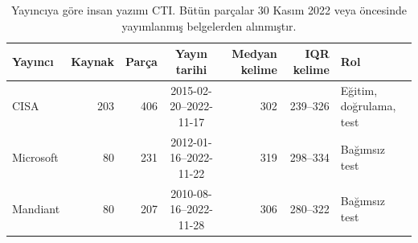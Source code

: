 \begin{table}[t]
\centering
\footnotesize
\caption{Yayıncıya göre insan yazımı CTI. Bütün parçalar 30 Kasım 2022 veya öncesinde yayımlanmış belgelerden alınmıştır.}
\label{tab:external}
\begin{tabular}{lrrcrrl}
\toprule
Yayıncı & Kaynak & Parça & Yayın tarihi & Medyan kelime & IQR kelime & Rol \\
\midrule
CISA & 203 & 406 & 2015-02-20--2022-11-17 & 302 & 239--326 & Eğitim, doğrulama, test \\
Microsoft & 80 & 231 & 2012-01-16--2022-11-22 & 319 & 298--334 & Bağımsız test \\
Mandiant & 80 & 207 & 2010-08-16--2022-11-28 & 306 & 280--322 & Bağımsız test \\
\bottomrule
\end{tabular}
\end{table}
